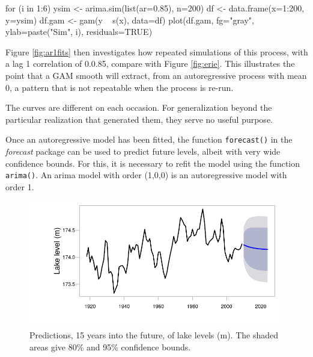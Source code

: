 \documentclass{tufte-book}\usepackage[]{graphicx}\usepackage[]{color}
\newcommand{\txtt}[1]{\texttt{#1}}
\begin{document}
\begin{marginfigure}[-1.5cm]
\begin{Schunk}
\begin{Sinput}
for (i in 1:6){
ysim <-
  arima.sim(list(ar=0.85),
            n=200)
df <- data.frame(x=1:200,
                 y=ysim)
df.gam <- gam(y ~ s(x),
              data=df)
plot(df.gam, fg="gray",
     ylab=paste("Sim", i),
     residuals=TRUE)
}
\end{Sinput}
\end{Schunk}
\end{marginfigure}

Figure \ref{fig:ar1fits} then investigates how repeated simulations of
this process, with a lag 1 correlation of 0.0.85, compare with Figure
\ref{fig:erie}.  This illustrates the point that a GAM smooth will
extract, from an autoregressive process with mean 0, a pattern that is
not repeatable when the process is re-run.

The curves are different on each occasion.  For generalization beyond
the particular realization that generated them, they serve no useful
purpose.

Once an autoregressive model has been fitted, the function
\txtt{forecast()} in the \textit{forecast} package can be used to
predict future levels, albeit with very wide confidence bounds.
For this, it is necessary to refit the model using the function
\txtt{arima()}. An arima model with order (1,0,0) is an autoregressive
model with order 1.
\vspace*{10pt}

\begin{figure}
\begin{Schunk}


\centerline{\includegraphics[width=0.98\textwidth]{figs/9-Erie-fcast-1} }

\end{Schunk}
\caption{Predictions, 15 years into the future, of lake levels
  (m). The shaded areas give 80\% and 95\% confidence bounds.
}\label{Erie-fcastplot}
\end{figure}
\end{document}
